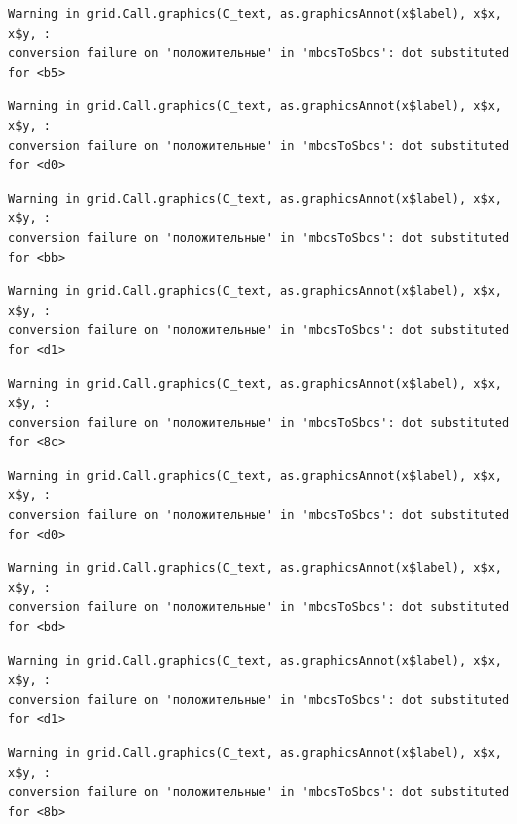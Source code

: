 \documentclass[
  letterpaper,
]{scrbook}
\theoremstyle{definition}
\theoremstyle{remark}
\begin{document}
\begin{verbatim}
Warning in grid.Call.graphics(C_text, as.graphicsAnnot(x$label), x$x, x$y, :
conversion failure on 'положительные' in 'mbcsToSbcs': dot substituted for <b5>
\end{verbatim}

\begin{verbatim}
Warning in grid.Call.graphics(C_text, as.graphicsAnnot(x$label), x$x, x$y, :
conversion failure on 'положительные' in 'mbcsToSbcs': dot substituted for <d0>
\end{verbatim}

\begin{verbatim}
Warning in grid.Call.graphics(C_text, as.graphicsAnnot(x$label), x$x, x$y, :
conversion failure on 'положительные' in 'mbcsToSbcs': dot substituted for <bb>
\end{verbatim}

\begin{verbatim}
Warning in grid.Call.graphics(C_text, as.graphicsAnnot(x$label), x$x, x$y, :
conversion failure on 'положительные' in 'mbcsToSbcs': dot substituted for <d1>
\end{verbatim}

\begin{verbatim}
Warning in grid.Call.graphics(C_text, as.graphicsAnnot(x$label), x$x, x$y, :
conversion failure on 'положительные' in 'mbcsToSbcs': dot substituted for <8c>
\end{verbatim}

\begin{verbatim}
Warning in grid.Call.graphics(C_text, as.graphicsAnnot(x$label), x$x, x$y, :
conversion failure on 'положительные' in 'mbcsToSbcs': dot substituted for <d0>
\end{verbatim}

\begin{verbatim}
Warning in grid.Call.graphics(C_text, as.graphicsAnnot(x$label), x$x, x$y, :
conversion failure on 'положительные' in 'mbcsToSbcs': dot substituted for <bd>
\end{verbatim}

\begin{verbatim}
Warning in grid.Call.graphics(C_text, as.graphicsAnnot(x$label), x$x, x$y, :
conversion failure on 'положительные' in 'mbcsToSbcs': dot substituted for <d1>
\end{verbatim}

\begin{verbatim}
Warning in grid.Call.graphics(C_text, as.graphicsAnnot(x$label), x$x, x$y, :
conversion failure on 'положительные' in 'mbcsToSbcs': dot substituted for <8b>
\end{verbatim}
\end{document}
